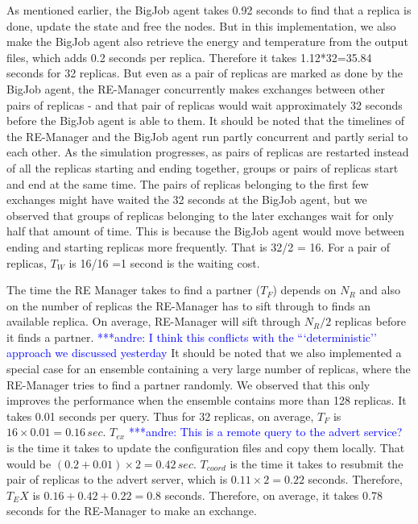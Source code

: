 \documentclass{rspublic}
\newcommand{\alnote}[1]{ {\textcolor{blue} { ***andre: #1 }}}
\newcommand{\alnote}[1]{}
\begin{document}

As mentioned earlier, the BigJob agent takes 0.92 seconds to find that
a replica is done, update the state and free the
nodes. But in this implementation, we also make the BigJob agent also 
retrieve the energy and temperature from the output files, which 
adds 0.2 seconds per replica. Therefore it takes 1.12*32=35.84 seconds 
for 32 replicas. But even as a pair of replicas are marked as done 
by the BigJob agent, the
RE-Manager concurrently makes exchanges between other pairs of
replicas - and that pair of replicas would wait approximately 32 seconds before the BigJob agent is able to them. It should be noted that the timelines of the RE-Manager and the BigJob agent run partly concurrent and partly serial to each other.  As the simulation progresses, as pairs of replicas are restarted instead of
all the replicas starting and ending together, groups or pairs of
replicas start and end at the same time. The pairs
of replicas belonging to the first few exchanges might have waited the
32 seconds at the BigJob agent, but we observed that groups of
replicas belonging to the later exchanges wait for only half that
amount of time. This is because the BigJob agent would move between ending and starting replicas more frequently. That is 32/2 = 16. For a pair of replicas, $T_W$ is 16/16 =1 second is the waiting cost.

The time the RE Manager takes to find a partner ($T_F$)
depends on $N_R$ and also on the number of replicas the RE-Manager has
to sift through to finds an available replica. On average, RE-Manager
will sift through $N_R/2$ replicas before it finds a partner. \alnote{I think
this conflicts with the ```deterministic'' approach we discussed yesterday} It
should be noted that we also implemented a special case for an ensemble 
containing a very large number of replicas, where the RE-Manager tries to find a
partner randomly. We observed that this only improves the performance
when the ensemble contains more than 128 replicas. It takes 0.01
seconds per query. Thus for 32 replicas, on average, $T_F$ is
$16\times 0.01=0.16\,sec$. 
$T_{ex}$ \alnote{This is a remote query to the advert service?} is the time it takes to update
the configuration files and copy them locally. That would be
$({0.2+0.01})\times 2=0.42\,sec.$ $T_{coord}$ is the time it takes to
resubmit the pair of replicas to the advert server, which is
$0.11\times 2 = 0.22$ seconds. Therefore, $T_EX$ is
$0.16+0.42+0.22=0.8$ seconds. Therefore, on average, it takes 0.78
seconds for the RE-Manager to make an exchange. 
\end{document}
